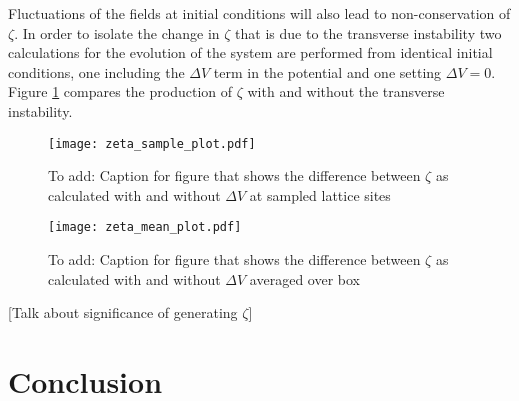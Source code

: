 \documentclass[letterpaper,11pt]{article}
\begin{document}
Fluctuations of the fields at initial conditions will also lead to non-conservation of $\zeta$. In order to isolate the change in $\zeta$ that is due to the transverse instability two calculations for the evolution of the system are performed from identical initial conditions, one including the $\Delta V$ term in the potential and one setting $\Delta V=0$. Figure \ref{zeta sample plot} compares the production of $\zeta$ with and without the transverse instability.


\begin{figure}
\begin{center}
\texttt{[image: zeta\_sample\_plot.pdf]}
\caption{To add: Caption for figure that shows the difference between $\zeta$ as calculated with and without $\Delta V$ at sampled lattice sites}
\label{zeta sample plot}
\end{center}
\end{figure}

\begin{figure}
\begin{center}
\texttt{[image: zeta\_mean\_plot.pdf]}
\caption{To add: Caption for figure that shows the difference between $\zeta$ as calculated with and without $\Delta V$ averaged over box}
\label{zeta mean plot}
\end{center}
\end{figure}

[Talk about significance of generating $\zeta$]

\section{Conclusion}
\end{document}
